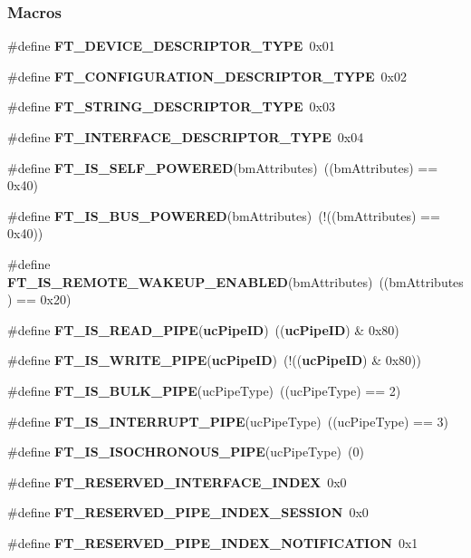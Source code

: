 \subsubsection*{Macros}
\begin{DoxyCompactItemize}
\item 
\#define {\bf F\+T\+\_\+\+D\+E\+V\+I\+C\+E\+\_\+\+D\+E\+S\+C\+R\+I\+P\+T\+O\+R\+\_\+\+T\+Y\+PE}~0x01
\item 
\#define {\bf F\+T\+\_\+\+C\+O\+N\+F\+I\+G\+U\+R\+A\+T\+I\+O\+N\+\_\+\+D\+E\+S\+C\+R\+I\+P\+T\+O\+R\+\_\+\+T\+Y\+PE}~0x02
\item 
\#define {\bf F\+T\+\_\+\+S\+T\+R\+I\+N\+G\+\_\+\+D\+E\+S\+C\+R\+I\+P\+T\+O\+R\+\_\+\+T\+Y\+PE}~0x03
\item 
\#define {\bf F\+T\+\_\+\+I\+N\+T\+E\+R\+F\+A\+C\+E\+\_\+\+D\+E\+S\+C\+R\+I\+P\+T\+O\+R\+\_\+\+T\+Y\+PE}~0x04
\item 
\#define {\bf F\+T\+\_\+\+I\+S\+\_\+\+S\+E\+L\+F\+\_\+\+P\+O\+W\+E\+R\+ED}(bm\+Attributes)~((bm\+Attributes) == 0x40)
\item 
\#define {\bf F\+T\+\_\+\+I\+S\+\_\+\+B\+U\+S\+\_\+\+P\+O\+W\+E\+R\+ED}(bm\+Attributes)~(!((bm\+Attributes) == 0x40))
\item 
\#define {\bf F\+T\+\_\+\+I\+S\+\_\+\+R\+E\+M\+O\+T\+E\+\_\+\+W\+A\+K\+E\+U\+P\+\_\+\+E\+N\+A\+B\+L\+ED}(bm\+Attributes)~((bm\+Attributes) == 0x20)
\item 
\#define {\bf F\+T\+\_\+\+I\+S\+\_\+\+R\+E\+A\+D\+\_\+\+P\+I\+PE}({\bf uc\+Pipe\+ID})~(({\bf uc\+Pipe\+ID}) \& 0x80)
\item 
\#define {\bf F\+T\+\_\+\+I\+S\+\_\+\+W\+R\+I\+T\+E\+\_\+\+P\+I\+PE}({\bf uc\+Pipe\+ID})~(!(({\bf uc\+Pipe\+ID}) \& 0x80))
\item 
\#define {\bf F\+T\+\_\+\+I\+S\+\_\+\+B\+U\+L\+K\+\_\+\+P\+I\+PE}(uc\+Pipe\+Type)~((uc\+Pipe\+Type) == 2)
\item 
\#define {\bf F\+T\+\_\+\+I\+S\+\_\+\+I\+N\+T\+E\+R\+R\+U\+P\+T\+\_\+\+P\+I\+PE}(uc\+Pipe\+Type)~((uc\+Pipe\+Type) == 3)
\item 
\#define {\bf F\+T\+\_\+\+I\+S\+\_\+\+I\+S\+O\+C\+H\+R\+O\+N\+O\+U\+S\+\_\+\+P\+I\+PE}(uc\+Pipe\+Type)~(0)
\item 
\#define {\bf F\+T\+\_\+\+R\+E\+S\+E\+R\+V\+E\+D\+\_\+\+I\+N\+T\+E\+R\+F\+A\+C\+E\+\_\+\+I\+N\+D\+EX}~0x0
\item 
\#define {\bf F\+T\+\_\+\+R\+E\+S\+E\+R\+V\+E\+D\+\_\+\+P\+I\+P\+E\+\_\+\+I\+N\+D\+E\+X\+\_\+\+S\+E\+S\+S\+I\+ON}~0x0
\item 
\#define {\bf F\+T\+\_\+\+R\+E\+S\+E\+R\+V\+E\+D\+\_\+\+P\+I\+P\+E\+\_\+\+I\+N\+D\+E\+X\+\_\+\+N\+O\+T\+I\+F\+I\+C\+A\+T\+I\+ON}~0x1

\end{DoxyCompactItemize}
